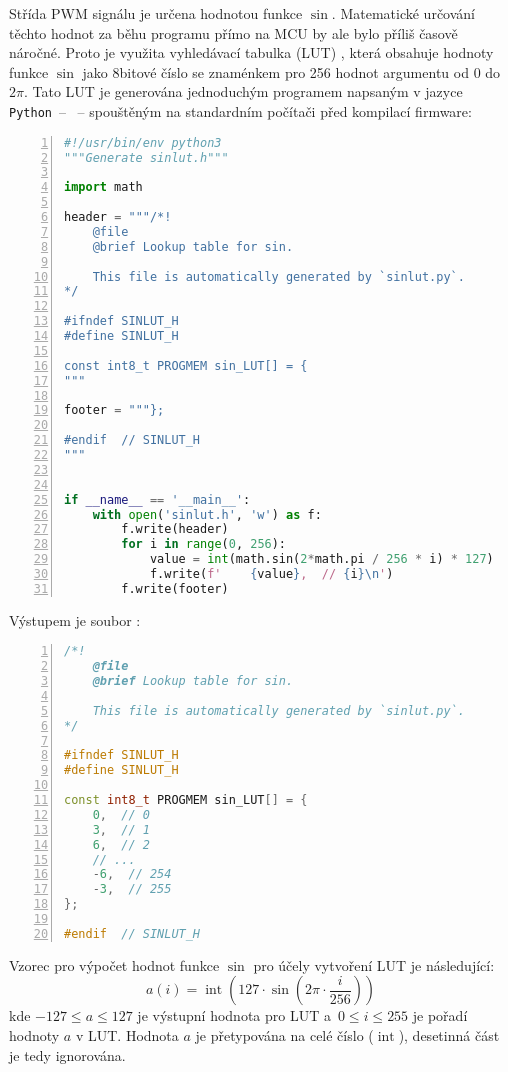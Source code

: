 Střída PWM signálu je určena hodnotou funkce $\sin$. Matematické určování
těchto hodnot za běhu programu přímo na MCU by ale bylo příliš časově náročné.
Proto je využita vyhledávací tabulka (LUT) , která obsahuje
hodnoty funkce $\sin$ jako 8bitové číslo se znaménkem pro 256 hodnot argumentu
od $0$ do $2\pi$. Tato LUT je generována jednoduchým programem napsaným
v jazyce \texttt{Python}~-- ~-- spouštěným na standardním
počítači před kompilací firmware:
\begin{lstlisting}[language=Python,numbers=left]
#!/usr/bin/env python3
"""Generate sinlut.h"""

import math

header = """/*!
    @file
    @brief Lookup table for sin.

    This file is automatically generated by `sinlut.py`.
*/

#ifndef SINLUT_H
#define SINLUT_H

const int8_t PROGMEM sin_LUT[] = {
"""

footer = """};

#endif  // SINLUT_H
"""


if __name__ == '__main__':
    with open('sinlut.h', 'w') as f:
        f.write(header)
        for i in range(0, 256):
            value = int(math.sin(2*math.pi / 256 * i) * 127)
            f.write(f'    {value},  // {i}\n')
        f.write(footer)
\end{lstlisting}

Výstupem je soubor :
\begin{lstlisting}[language=C++,numbers=left]
/*!
    @file
    @brief Lookup table for sin.

    This file is automatically generated by `sinlut.py`.
*/

#ifndef SINLUT_H
#define SINLUT_H

const int8_t PROGMEM sin_LUT[] = {
    0,  // 0
    3,  // 1
    6,  // 2
    // ...
    -6,  // 254
    -3,  // 255
};

#endif  // SINLUT_H
\end{lstlisting}

Vzorec pro výpočet hodnot funkce $\sin$ pro účely vytvoření LUT je následující:
\begin{equation}
    a(i) = \operatorname{int}\left( \num{127}\cdot\sin{\left(2\pi \cdot \frac{i}{256}\right)} \right)
\end{equation}
kde $\num{-127} \le a \le \num{127}$ je výstupní hodnota pro LUT
a~$\num{0} \le i \le \num{255}$ je pořadí hodnoty $a$ v LUT. Hodnota $a$ je
přetypována na celé číslo ($\operatorname{int}$), desetinná část je tedy
ignorována.

